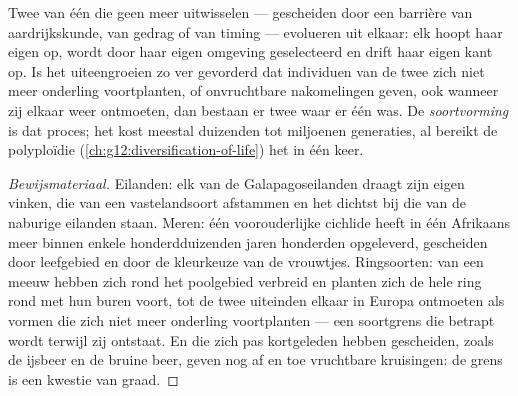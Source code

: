\begin{proposition}[Soortvorming]\label{prop:g12:selection-drift-speciation:speciation}
Twee  van één  die geen  meer uitwisselen ---
gescheiden door een barrière van aardrijkskunde, van gedrag of van timing
--- evolueren uit elkaar: elk hoopt haar eigen  op, wordt door
haar eigen omgeving geselecteerd en drift haar eigen kant op. Is het
uiteengroeien zo ver gevorderd dat individuen van de twee  zich
niet meer onderling voortplanten, of onvruchtbare nakomelingen geven, ook
wanneer zij elkaar weer ontmoeten, dan bestaan er twee  waar er één
was. De \emph{soortvorming} is dat proces; het kost
meestal duizenden tot miljoenen generaties, al bereikt de polyploïdie
(\cref{ch:g12:diversification-of-life}) het in één keer.
\end{proposition}
\begin{proof}[Bewijsmateriaal]
Eilanden: elk van de Galapagoseilanden draagt zijn eigen vinken, die van
een vastelandsoort afstammen en het dichtst bij die van de naburige
eilanden staan. Meren: één voorouderlijke cichlide heeft in één Afrikaans
meer binnen enkele honderdduizenden jaren honderden  opgeleverd,
gescheiden door leefgebied en door de kleurkeuze van de vrouwtjes.
Ringsoorten:  van een meeuw hebben zich rond het poolgebied
verbreid en planten zich de hele ring rond met hun buren voort, tot de
twee uiteinden elkaar in Europa ontmoeten als vormen die zich niet meer
onderling voortplanten --- een soortgrens die betrapt wordt terwijl zij
ontstaat. En  die zich pas kortgeleden hebben gescheiden, zoals de
ijsbeer en de bruine beer, geven nog af en toe vruchtbare kruisingen: de
grens is een kwestie van graad.
\end{proof}

